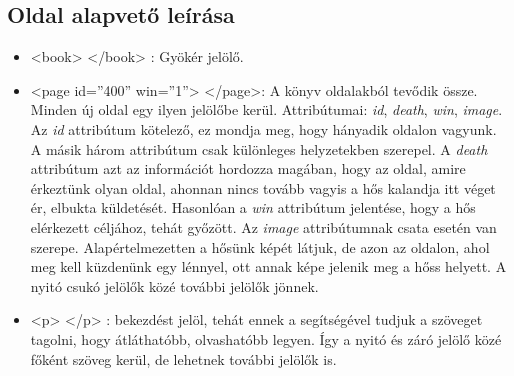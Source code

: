 \documentclass[12pt,a4paper,oneside]{report}
\newcommand{\xtag}[1]{{\color{Tag}#1}}
\newcommand{\xattr}[2]{{\color{Attr}#1}={\color{Value}''#2''}}
\newcommand{\attr}{\emph}
\begin{document}
    \subsection{Oldal alapvető leírása}
      \begin{itemize}
        \item <\xtag{book}> <\xtag{/book}> : Gyökér jelölő.

        \item <\xtag{page} \xattr{id}{400} \xattr{win}{1}>
          <\xtag{/page}>: A könyv oldalakból tevődik össze. Minden új
          oldal egy ilyen jelölőbe kerül. Attribútumai: \attr{id},
          \attr{death}, \attr{win}, \attr{image}.  Az \attr{id}
          attribútum kötelező, ez mondja meg, hogy hányadik oldalon
          vagyunk. A másik három attribútum csak különleges
          helyzetekben szerepel. A \attr{death} attribútum azt az
          információt hordozza magában, hogy az oldal, amire érkeztünk
          olyan oldal, ahonnan nincs tovább vagyis a hős kalandja itt
          véget ér, elbukta küldetését. Hasonlóan a \attr{win}
          attribútum jelentése, hogy a hős elérkezett céljához, tehát
          győzött. Az \attr{image} attribútumnak csata esetén van
          szerepe. Alapértelmezetten a hősünk képét látjuk, de azon az
          oldalon, ahol meg kell küzdenünk egy lénnyel, ott annak képe
          jelenik meg a hőss helyett. A nyitó csukó jelölők közé
          további jelölők jönnek.
          
        \item <\xtag{p}> <\xtag{/p}> : bekezdést jelöl, tehát ennek a
          segítségével tudjuk a szöveget tagolni, hogy átláthatóbb,
          olvashatóbb legyen. Így a nyitó és záró jelölő közé főként
          szöveg kerül, de lehetnek további jelölők is.
      \end{itemize}
      
\end{document}
